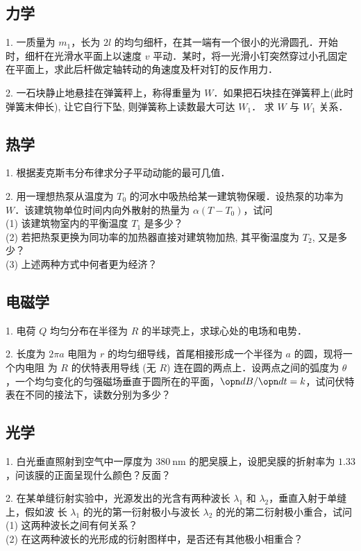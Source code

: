 \subsection{力学}
1. 一质量为 $m_{1}$，长为 $2l$ 的均匀细杆，在其一端有一个很小的光滑圆孔．开始时，细杆在光滑水平面上以速度 $v$ 平动．某时，将一光滑小钉突然穿过小孔固定在平面上，求此后杆做定轴转动的角速度及杆对钉的反作用力．

2. 一石块静止地悬挂在弹簧秤上，称得重量为 $W$．如果把石块挂在弹簧秤上(此时弹簧末伸长), 让它自行下坠, 则弹簧称上读数最大可达 $W_{1}$． 求 $W$ 与 $W_{1}$ 关系．
\subsection{热学}
1. 根据麦克斯韦分布律求分子平动动能的最可几值．

2. 用一理想热泵从温度为 $T_{0}$ 的河水中吸热给某一建筑物保暖．设热泵的功率为 $W$．该建筑物单位时间内向外散射的热量为 $\alpha\left(T-T_{0}\right)$，试问\\
(1) 该建筑物室内的平衡温度 $T_{1}$ 是多少？\\
(2) 若把热泵更换为同功率的加热器直接对建筑物加热, 其平衡温度为 $T_{2}$, 又是多少？\\
(3) 上述两种方式中何者更为经济？\\
\subsection{电磁学}
1. 电荷 $Q$ 均匀分布在半径为 $R$ 的半球壳上，求球心处的电场和电势．

2. 长度为 $2 \pi a$ 电阻为 $r$ 的均匀细导线，首尾相接形成一个半径为 $a$ 的圆，现将一个内电阻 为 $R$ 的伏特表用导线 (无 $R$) 连在圆的两点上．设两点之间的弧度为 $\theta$，一个均匀变化的匀强磁场垂直于圆所在的平面，$\opn dB/\opn dt =k$，试问伏特表在不同的接法下，读数分别为多少？
\subsection{光学}
1. 白光垂直照射到空气中一厚度为 $380 \mathrm{~nm}$ 的肥㚖膜上，设肥㚖膜的折射率为 $1.33$，问该膜的正面呈现什么颜色？反面？

2. 在某单缝衍射实验中，光源发出的光含有两种波长 $\lambda_{1}$ 和 $\lambda_{2}$，垂直入射于单缝上，假如波 长 $\lambda_{1}$ 的光的第一衍射极小与波长 $\lambda_{2}$ 的光的第二衍射极小重合，试问\\
(1) 这两种波长之间有何关系？\\
(2) 在这两种波长的光形成的衍射图样中，是否还有其他极小相重合？